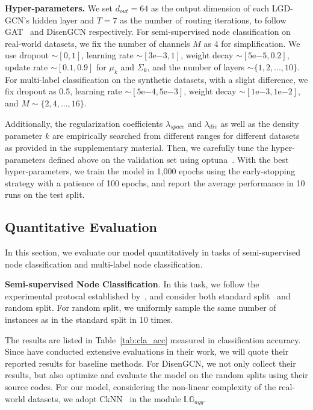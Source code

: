 \documentclass[accepted]{uai2021} %
\begin{document}
\textbf{Hyper-parameters.} We set $d_{out}=64$ as the output dimension of each LGD-GCN's hidden layer and $T=7$ as the number of routing iterations, to follow GAT~\citep{Velickovic2018GraphAN} and DisenGCN respectively. For semi-supervised node classification on real-world datasets, we fix the number of channels $M$ as 4 for simplification. We use dropout $\sim\left[0, 1\right]$, learning rate $\sim\left[3\mathrm{e}{-3}, 1\right]$, weight decay $\sim\left[5\mathrm{e}{-5}, 0.2\right]$, update rate $\sim\left[0.1, 0.9\right]$ for $\mu_k$ and $\Sigma_k$, and the number of layers $\sim\{1, 2,...,10\}$. For multi-label classification on the synthetic datasets, with a slight difference, we fix dropout as 0.5, learning rate $\sim\left[5\mathrm{e}{-4}, 5\mathrm{e}{-3}\right]$, weight decay $\sim\left[1\mathrm{e}{-3}, 1\mathrm{e}{-2}\right]$, and $M\sim\{2,4,...,16\}$. 

Additionally, the regularization coefficients $\lambda_{space}$ and $\lambda_{div}$ as well as the density parameter $k$ are empirically searched from different ranges for different datasets as provided in the supplementary material. Then, we carefully tune the hyper-parameters defined above on the validation set using optuna~\citep{Akiba2019OptunaAN}. With the best hyper-parameters, we train the model in 1,000 epochs using the early-stopping strategy with a patience of 100 epochs, and report the average performance in 10 runs on the test split.

\subsection{Quantitative Evaluation}
In this section, we evaluate our model quantitatively in tasks of semi-supervised node classification and multi-label node classification.

\textbf{Semi-supervised Node Classification}.
In this task, we follow the experimental protocal established by~\citet{Kipf2017SemiSupervisedCW,Velickovic2018GraphAN}, and consider both standard split~\citep{Yang2016RevisitingSL} and random split. For random split, we uniformly sample the same number of instances as in the standard split in 10 times.

The results are listed in Table~\ref{tab:cla_acc} measured in classification accuracy. Since \citet{Shchur2018PitfallsOG} have conducted extensive evaluations in their work, we will quote their reported results for baseline methods. For DisenGCN, we not only collect their results, but also optimize and evaluate the model on the random splits using their source codes. For our model, considering the non-linear complexity of the real-world datasets, we adopt CkNN~\citep{berry2016consistent} in the module $\mathbb{LG}_{agg}$.
\end{document}
